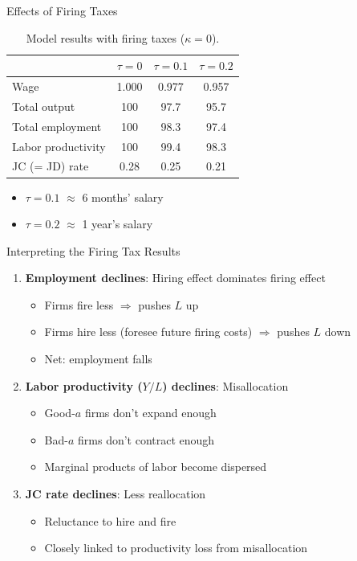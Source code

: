\documentclass[blue]{beamer}
\begin{document}
\begin{frame}{Effects of Firing Taxes}
	\begin{table}
		\centering
		\begin{tabular}{lccc}
			\toprule
			& $\tau = 0$ & $\tau = 0.1$ & $\tau = 0.2$ \\
			\midrule
			Wage & 1.000 & 0.977 & 0.957 \\
			Total output & 100 & 97.7 & 95.7 \\
			Total employment & 100 & 98.3 & 97.4 \\
			Labor productivity & 100 & 99.4 & 98.3 \\
			JC (= JD) rate & 0.28 & 0.25 & 0.21 \\
			\bottomrule
		\end{tabular}
		\caption{Model results with firing taxes ($\kappa = 0$).}
	\end{table}
	
	\begin{itemize}
		\item $\tau = 0.1$ $\approx$ 6 months' salary
		\item $\tau = 0.2$ $\approx$ 1 year's salary
	\end{itemize}
\end{frame}

\begin{frame}{Interpreting the Firing Tax Results}
	\begin{enumerate}
		\item \textbf{Employment declines}: Hiring effect dominates firing effect
		\begin{itemize}
			\item Firms fire less $\Rightarrow$ pushes $L$ up
			\item Firms hire less (foresee future firing costs) $\Rightarrow$ pushes $L$ down
			\item Net: employment falls
		\end{itemize}
		
		\bigskip
		\item \textbf{Labor productivity ($Y/L$) declines}: Misallocation
		\begin{itemize}
			\item Good-$a$ firms don't expand enough
			\item Bad-$a$ firms don't contract enough
			\item Marginal products of labor become dispersed
		\end{itemize}
		
		\bigskip
		\item \textbf{JC rate declines}: Less reallocation
		\begin{itemize}
			\item Reluctance to hire and fire
			\item Closely linked to productivity loss from misallocation
		\end{itemize}
	\end{enumerate}
\end{frame}
\end{document}
